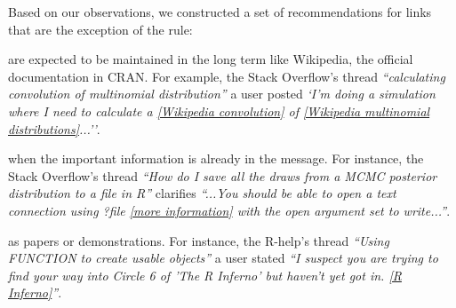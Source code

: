     Based on our observations, we constructed a set of recommendations for links that are the exception of the rule:

    \begin{description}[itemsep=3pt, topsep=2pt, leftmargin=3em, parsep=0pt]
        \item[Well known websites] are expected to be maintained in the long term like Wikipedia, the official documentation in CRAN.
        For example, the Stack Overflow's thread \textit{``calculating convolution of multinomial distribution''} a user posted \textit{`I'm doing a simulation where I need to calculate a \href{https://en.wikipedia.org/wiki/Convolution_of_probability_distributions}{[Wikipedia convolution]} of \href{https://en.wikipedia.org/wiki/Multinomial_distribution}{[Wikipedia multinomial distributions]}...''}.

        \item[Resources that support or expand the message] when the important information is already in the message.
        For instance, the Stack Overflow's thread \textit{``How do I save all the draws from a MCMC posterior distribution to a file in R''} clarifies \textit{``...You should be able to open a text connection using ?file \href{http://stat.ethz.ch/R-manual/R-devel/library/base/html/connections.html}{[more information]} with the open argument set to write...''}.

        \item[Material relevant to the message is too big] as papers or demonstrations.
        For instance, the R-help's thread \textit{``Using FUNCTION to create usable objects''} a user stated \textit{``I suspect you are trying to find your way into Circle 6 of 'The R Inferno' but haven't yet got in. \href{http://www.burns-stat.com/pages/Tutor/R\_inferno.pdf}{[R Inferno]}''}.
    \end{description}




